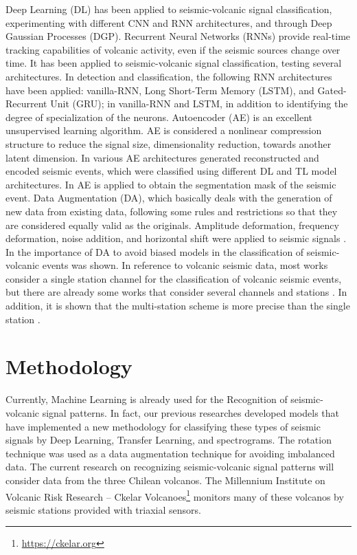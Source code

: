 \documentclass[journal]{IEEEtran}
\begin{document}
Deep Learning (DL) has been applied to seismic-volcanic signal classification, experimenting with different CNN\cite{mythesismaster} and RNN architectures\cite{salazar2020deep,ferreira2023deep,canario2020indepth}, and through Deep Gaussian Processes (DGP)\cite{lopez2020acontribution}.
Recurrent Neural Networks (RNNs) provide real-time tracking capabilities of volcanic activity, even if the seismic sources change over time. It has been applied to seismic-volcanic signal classification, testing several architectures\cite{salazar2020deep}. In detection and classification, the following RNN architectures have been applied: vanilla-RNN, Long Short-Term Memory (LSTM), and Gated-Recurrent Unit (GRU)\cite{titos2018detection}; in \cite{rodriguez2021bayesian} vanilla-RNN and LSTM, in addition to identifying the degree of specialization of the neurons.
Autoencoder (AE) is an excellent unsupervised learning algorithm. AE is considered a nonlinear compression structure to reduce the signal size, dimensionality reduction, towards another latent dimension. In \cite{mythesismaster} various AE architectures generated reconstructed and encoded seismic events, which were classified using different DL and TL model architectures. In \cite{rodriguez2021bayesian} AE is applied to obtain the segmentation mask of the seismic event.
Data Augmentation (DA), which basically deals with the generation of new data from existing data, following some rules and restrictions so that they are considered equally valid as the originals. Amplitude deformation, frequency deformation, noise addition, and horizontal shift were applied to seismic signals \cite{curilem2018using}. In \cite{salazar2022multi} the importance of DA to avoid biased models in the classification of seismic-volcanic events was shown.
In reference to volcanic seismic data, most works consider a single station channel for the classification of volcanic seismic events, but there are already some works that consider several channels and stations \cite{lara2020automatic,curilem2016pattern,maggi2017implementation,ferreira2023deep}. In addition, it is shown that the multi-station scheme is more precise than the single station \cite{titos2019classification,ferreira2023deep}.


\section{Methodology}
Currently, Machine Learning is already used for the Recognition of seismic-volcanic signal patterns.
In fact, our previous researches developed\cite{mythesismaster,salazar2022multi} models that have implemented a new methodology for classifying these types of seismic signals by Deep Learning, Transfer Learning, and spectrograms. The rotation technique was used as a data augmentation technique for avoiding imbalanced data.
The current research on recognizing seismic-volcanic signal patterns will consider data from the three Chilean volcanos. The Millennium Institute on Volcanic Risk Research – Ckelar Volcanoes\footnote{\href{https://ckelar.org}{\color{blue}https://ckelar.org}} monitors many of these volcanos by seismic stations provided with triaxial sensors.
\end{document}
